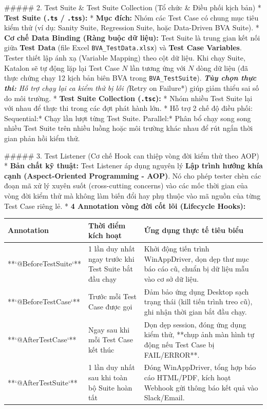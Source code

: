 {##### 2. Test Suite & Test Suite Collection (Tổ chức & Điều phối kịch bản)
* \textbf{Test Suite (\texttt{.ts} / \texttt{.tss}):}
  * \textbf{Mục đích:} Nhóm các Test Case có chung mục tiêu kiểm thử (ví dụ: Sanity Suite, Regression Suite, hoặc Data-Driven BVA Suite).
  * \textbf{Cơ chế Data Binding (Ràng buộc dữ liệu):} Test Suite là trung gian kết nối giữa \textbf{Test Data} (file Excel \texttt{BVA_TestData.xlsx}) và \textbf{Test Case Variables}. Tester thiết lập ánh xạ (Variable Mapping) theo cột dữ liệu. Khi chạy Suite, Katalon sẽ tự động lặp lại Test Case $N$ lần tương ứng với $N$ dòng dữ liệu (đã thực chứng chạy 12 kịch bản biên BVA trong \texttt{BVA_TestSuite}).
  \textit{ \textbf{Tùy chọn thực thi:} Hỗ trợ chạy lại ca kiểm thử bị lỗi (}Retry on Failure*) giúp giảm thiểu sai số do môi trường.
* \textbf{Test Suite Collection (\texttt{.tsc}):}
  * Nhóm nhiều Test Suite lại với nhau để thực thi trong các đợt phát hành lớn.
  * Hỗ trợ 2 chế độ điều phối:
    \textit{ }Sequential:* Chạy lần lượt từng Test Suite.
    \textit{ }Parallel:* Phân bổ chạy song song nhiều Test Suite trên nhiều luồng hoặc môi trường khác nhau để rút ngắn thời gian phản hồi kiểm thử.

##### 3. Test Listener (Cơ chế Hook can thiệp vòng đời kiểm thử theo AOP)
* \textbf{Bản chất kỹ thuật:} Test Listener áp dụng nguyên lý \textbf{Lập trình hướng khía cạnh (Aspect-Oriented Programming - AOP)}. Nó cho phép tester chèn các đoạn mã xử lý xuyên suốt (cross-cutting concerns) vào các mốc thời gian của vòng đời kiểm thử mà không làm biến đổi hay phụ thuộc vào mã nguồn của từng Test Case riêng lẻ.
* \textbf{4 Annotation vòng đời cốt lõi (Lifecycle Hooks):}

\begin{table}[H]
\centering
\begin{tabular}{|l|l|l|}
\hline
\textbf{Annotation} & \textbf{Thời điểm kích hoạt} & \textbf{Ứng dụng thực tế tiêu biểu} \\ \hline
**`@BeforeTestSuite`** & 1 lần duy nhất ngay trước khi Test Suite bắt đầu chạy & Khởi động tiến trình WinAppDriver, dọn dẹp thư mục báo cáo cũ, chuẩn bị dữ liệu mẫu vào cơ sở dữ liệu. \\ \hline
**`@BeforeTestCase`** & Trước mỗi Test Case được gọi & Đảm bảo ứng dụng Desktop sạch trạng thái (kill tiến trình treo cũ), ghi nhận thời gian bắt đầu chạy. \\ \hline
**`@AfterTestCase`** & Ngay sau khi mỗi Test Case kết thúc & Dọn dẹp session, đóng ứng dụng kiểm thử, **chụp ảnh màn hình tự động nếu Test Case bị FAIL/ERROR**. \\ \hline
**`@AfterTestSuite`** & 1 lần duy nhất sau khi toàn bộ Suite hoàn tất & Đóng WinAppDriver, tổng hợp báo cáo HTML/PDF, kích hoạt Webhook gửi thông báo kết quả vào Slack/Email. \\ \hline
\end{tabular}
\end{table}




}
